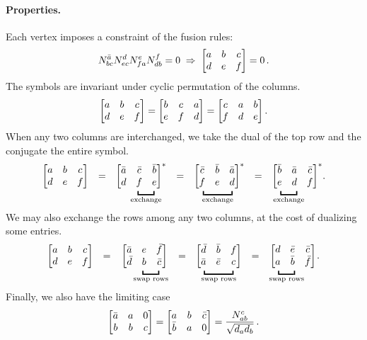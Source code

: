 \paragraph{Properties.}
Each vertex imposes a constraint of the fusion rules:
\begin{align}
	N^{\bar{a}}_{bc} N^d_{ec} N^e_{fa} N^f_{db} = 0
	\;\Rightarrow\; \begin{bmatrix} a & b & c \\ d & e & f \end{bmatrix} = 0 \,.
\end{align}
The symbols are invariant under cyclic permutation of the columns.
\begin{align}
	\begin{bmatrix} a & b & c \\ d & e & f \end{bmatrix} = \begin{bmatrix} b & c & a \\ e & f & d \end{bmatrix} = \begin{bmatrix} c & a & b \\ f & d & e \end{bmatrix} .
\end{align}
When any two columns are interchanged, we take the dual of the top row and the conjugate the entire symbol.
\begin{align}
\label{colexchange}
	\begin{array}{ccccccc @{} l}
		\Msixj{a & b & c}{d & e & f}
	&	=	&	\Msixj{\bar{a} & \bar{c} & \bar{b}}{d & f & e}^\ast
	&	=	&	\Msixj{\bar{c} & \bar{b} & \bar{a}}{f & e & d}^\ast
	&	=	&	\Msixj{\bar{b} & \bar{a} & \bar{c}}{e & d & f}^\ast
	&	.
	\\[-1.6ex]
	&&	\hspace{3ex} \underbracket{\hspace{4ex}}_{\text{exchange}} \hspace{0.7ex}
	&&	\underbracket{\hspace{7ex}}_{\text{exchange}} \hspace{0.7ex}
	&&	\underbracket{\hspace{4ex}}_{\text{exchange}} \hspace{4ex}
	\end{array}
\end{align}
We may also exchange the rows among any two columns, at the cost of dualizing some entries.
\begin{align}
	\begin{array}{ccccccc @{} l}
		\Msixj{a & b & c}{d & e & f}
	&	=	&	\Msixj{\bar{a} & e & \bar{f}}{\bar{d} & b & \bar{c}}
	&	=	&	\Msixj{\bar{d} & \bar{b} & f}{\bar{a} & \bar{e} & c}
	&	=	&	\Msixj{d & \bar{e} & \bar{c}}{a & \bar{b} & \bar{f}}
	&	.
	\\[-1.6ex]
	&&	\hspace{3ex}\underbracket{\hspace{4ex}}_{\text{swap rows}}
	&&	\underbracket{\hspace{7ex}}_{\text{swap rows}}
	&&	\underbracket{\hspace{4ex}}_{\text{swap rows}}\hspace{3ex}
	\end{array}
\end{align}
Finally, we also have the limiting case
\begin{align}
	\begin{bmatrix} \bar{a} & a & 0 \\ b & b & c \end{bmatrix}
	= \begin{bmatrix} a & b & \bar{c} \\ \bar{b} & a & 0 \end{bmatrix}
	= \frac{N^c_{ab}}{\sqrt{d_ad_b}} \,.
\end{align}


